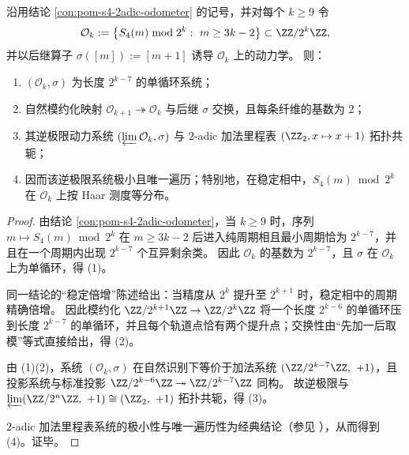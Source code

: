 \begin{theorem}[\texorpdfstring{$q=4$}{q=4} 的 \(2\)-adic 轨道逆极限为加法里程表系统]\label{thm:pom-s4-2adic-odometer-inverse-limit}
沿用结论 \ref{con:pom-s4-2adic-odometer} 的记号，并对每个 \(k\ge 9\) 令
\[
\mathcal O_k
:=\left\{S_4(m)\bmod 2^k:\ m\ge 3k-2\right\}\subset \ZZ/2^k\ZZ,
\]
并以后继算子 \(\sigma([m]):=[m+1]\) 诱导 \(\mathcal O_k\) 上的动力学。
则：
\begin{enumerate}
  \item \((\mathcal O_k,\sigma)\) 为长度 \(2^{k-7}\) 的单循环系统；
  \item 自然模约化映射 \(\mathcal O_{k+1}\twoheadrightarrow \mathcal O_k\) 与后继 \(\sigma\) 交换，且每条纤维的基数为 \(2\)；
  \item 其逆极限动力系统 \((\varprojlim \mathcal O_k,\sigma)\) 与 \(2\)-adic 加法里程表 \((\ZZ_2,x\mapsto x+1)\) 拓扑共轭；
  \item 因而该逆极限系统极小且唯一遍历；特别地，在稳定相中，\(S_4(m)\bmod 2^k\) 在 \(\mathcal O_k\) 上按 Haar 测度等分布。
\end{enumerate}
\end{theorem}
\begin{proof}
由结论 \ref{con:pom-s4-2adic-odometer}，当 \(k\ge 9\) 时，序列 \(m\mapsto S_4(m)\bmod 2^k\) 在 \(m\ge 3k-2\) 后进入纯周期相且最小周期恰为 \(2^{k-7}\)，并且在一个周期内出现 \(2^{k-7}\) 个互异剩余类。
因此 \(\mathcal O_k\) 的基数为 \(2^{k-7}\)，且 \(\sigma\) 在 \(\mathcal O_k\) 上为单循环，得 (1)。
\par
同一结论的“稳定倍增”陈述给出：当精度从 \(2^k\) 提升至 \(2^{k+1}\) 时，稳定相中的周期精确倍增。
因此模约化 \(\ZZ/2^{k+1}\ZZ\to\ZZ/2^k\ZZ\) 将一个长度 \(2^{k-6}\) 的单循环压到长度 \(2^{k-7}\) 的单循环，并且每个轨道点恰有两个提升点；交换性由“先加一后取模”等式直接给出，得 (2)。
\par
由 (1)(2)，系统 \((\mathcal O_k,\sigma)\) 在自然识别下等价于加法系统 \((\ZZ/2^{k-7}\ZZ,\ +1)\)，且投影系统与标准投影 \(\ZZ/2^{k-6}\ZZ\twoheadrightarrow \ZZ/2^{k-7}\ZZ\) 同构。
故逆极限与 \(\varprojlim(\ZZ/2^n\ZZ,\ +1)\cong(\ZZ_2,\ +1)\) 拓扑共轭，得 (3)。
\par
\(2\)-adic 加法里程表系统的极小性与唯一遍历性为经典结论（参见 \cite{WaltersErgodicTheory}），从而得到 (4)。证毕。
\end{proof}

